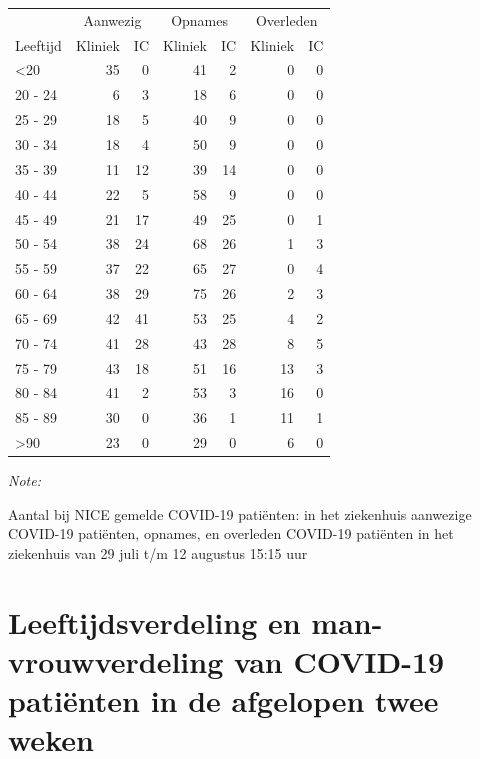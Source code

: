 \documentclass[
  english,
  man,floatsintext]{apa6}
\begin{document}
\begin{table}
\centering\begingroup\fontsize{10}{12}\selectfont

\begin{threeparttable}
\begin{tabular}{lrrrrrr}
\toprule
\multicolumn{1}{c}{ } & \multicolumn{2}{c}{Aanwezig} & \multicolumn{2}{c}{Opnames} & \multicolumn{2}{c}{Overleden} \\
\cmidrule(l{3pt}r{3pt}){2-3} \cmidrule(l{3pt}r{3pt}){4-5} \cmidrule(l{3pt}r{3pt}){6-7}
Leeftijd & Kliniek & IC & Kliniek & IC & Kliniek & IC\\
\midrule
<20 & 35 & 0 & 41 & 2 & 0 & 0\\
20 - 24 & 6 & 3 & 18 & 6 & 0 & 0\\
25 - 29 & 18 & 5 & 40 & 9 & 0 & 0\\
30 - 34 & 18 & 4 & 50 & 9 & 0 & 0\\
35 - 39 & 11 & 12 & 39 & 14 & 0 & 0\\
40 - 44 & 22 & 5 & 58 & 9 & 0 & 0\\
45 - 49 & 21 & 17 & 49 & 25 & 0 & 1\\
50 - 54 & 38 & 24 & 68 & 26 & 1 & 3\\
55 - 59 & 37 & 22 & 65 & 27 & 0 & 4\\
60 - 64 & 38 & 29 & 75 & 26 & 2 & 3\\
65 - 69 & 42 & 41 & 53 & 25 & 4 & 2\\
70 - 74 & 41 & 28 & 43 & 28 & 8 & 5\\
75 - 79 & 43 & 18 & 51 & 16 & 13 & 3\\
80 - 84 & 41 & 2 & 53 & 3 & 16 & 0\\
85 - 89 & 30 & 0 & 36 & 1 & 11 & 1\\
>90 & 23 & 0 & 29 & 0 & 6 & 0\\
\bottomrule
\end{tabular}
\begin{tablenotes}
\item \textit{Note: } 
\item Aantal bij NICE gemelde COVID-19 patiënten: in het ziekenhuis aanwezige COVID-19 patiënten, opnames, en overleden COVID-19 patiënten in het ziekenhuis van 29 juli t/m 12 augustus 15:15 uur
\end{tablenotes}
\end{threeparttable}
\endgroup{}
\end{table}

\newpage

\hypertarget{leeftijdsverdeling-en-man-vrouwverdeling-van-covid-19-patiuxebnten-in-de-afgelopen-twee-weken}{%
\section{Leeftijdsverdeling en man-vrouwverdeling van COVID-19 patiënten in de afgelopen twee weken}\label{leeftijdsverdeling-en-man-vrouwverdeling-van-covid-19-patiuxebnten-in-de-afgelopen-twee-weken}}
\end{document}
